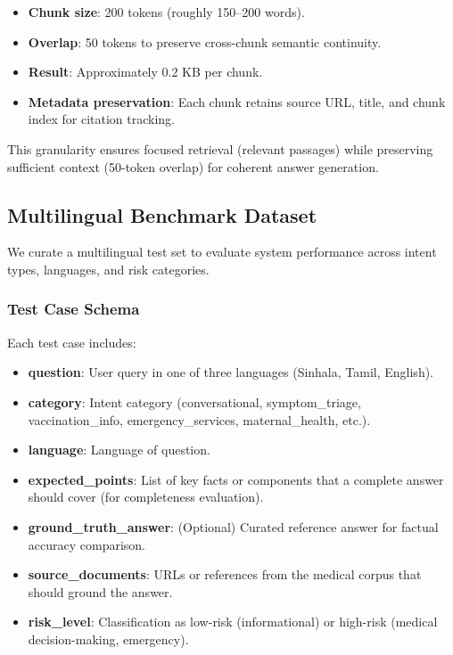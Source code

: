 \documentclass[11pt,a4paper]{article}
\begin{document}
\begin{itemize}
    \item \textbf{Chunk size}: 200 tokens (roughly 150--200 words).
    \item \textbf{Overlap}: 50 tokens to preserve cross-chunk semantic continuity.
    \item \textbf{Result}: Approximately 0.2 KB per chunk.
    \item \textbf{Metadata preservation}: Each chunk retains source URL, title, and chunk index for citation tracking.
\end{itemize}

This granularity ensures focused retrieval (relevant passages) while preserving sufficient context (50-token overlap) for coherent answer generation.

\subsection{Multilingual Benchmark Dataset}
\label{sec:dataset-benchmark}

We curate a multilingual test set to evaluate system performance across intent types, languages, and risk categories.

\subsubsection{Test Case Schema}
Each test case includes:

\begin{itemize}
    \item \textbf{question}: User query in one of three languages (Sinhala, Tamil, English).
    \item \textbf{category}: Intent category (conversational, symptom\_triage, vaccination\_info, emergency\_services, maternal\_health, etc.).
    \item \textbf{language}: Language of question.
    \item \textbf{expected\_points}: List of key facts or components that a complete answer should cover (for completeness evaluation).
    \item \textbf{ground\_truth\_answer}: (Optional) Curated reference answer for factual accuracy comparison.
    \item \textbf{source\_documents}: URLs or references from the medical corpus that should ground the answer.
    \item \textbf{risk\_level}: Classification as low-risk (informational) or high-risk (medical decision-making, emergency).
\end{itemize}
\end{document}
